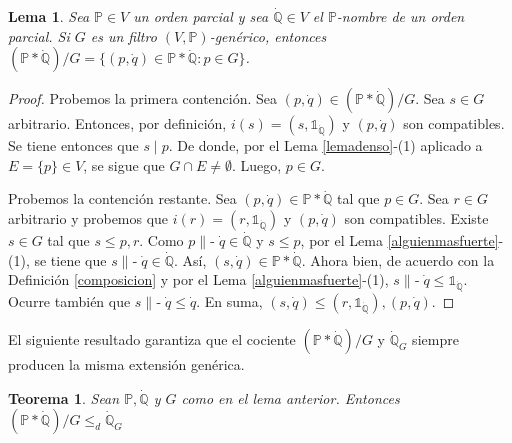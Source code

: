 \documentclass[11pt]{unam_tesis1}
\theoremstyle{MyThmStyle}
\theoremstyle{definition}
\theoremstyle{plain}
\newtheorem{theorem}[definition]{Teorema}
\newtheorem{lemma}[definition]{Lema}
\theoremstyle{remark}
\def\forces{\mathop{\parallel\!\!\!-}\nolimits}
\let\Vdash\forces
\let\leq\leqslant
\begin{document}
\begin{lemma}\label{igualdadcomposicion}
Sea $\mathbb P\in V$ un orden parcial y sea $\dot{\mathbb Q}\in V$ el $\mathbb P$-nombre de un orden parcial. Si $G$ es un filtro $(V,\mathbb P)$-gen\'erico, entonces $(\mathbb P*\dot{\mathbb Q})/G=\{(p,\dot{q})\in \mathbb P*\dot{\mathbb Q}:p\in G \}$.
\end{lemma}

\begin{proof}
Probemos la primera contenci\'on. Sea $(p,\dot q)\in (\mathbb P*\dot{\mathbb Q})/G$. Sea $s\in G$ arbitrario. Entonces, por definici\'on, $i(s)=(s,\mathds 1_{\dot{\mathbb Q}})$ y $(p,\dot q)$ son compatibles. Se tiene entonces que $s\mid p$. De donde, por el Lema \ref{lemadenso}-(1) aplicado a $E=\{p \}\in V$, se sigue que $G\cap E\neq \emptyset$. Luego, $p\in G$.

Probemos la contenci\'on restante. Sea $(p,\dot q)\in \mathbb P*\dot{\mathbb Q}$ tal que $p\in G$. Sea $r\in G$ arbitrario y probemos que $i(r)=(r,\mathds 1_{\dot{\mathbb Q}})$ y $(p,\dot q)$ son compatibles. Existe $s\in G$ tal que $s\leq p,r$. Como $p\Vdash \dot q\in \dot{\mathbb Q}$ y $s\leq p$, por el Lema \ref{alguienmasfuerte}-(1), se tiene que $s\Vdash \dot q\in \dot{\mathbb Q}$. As\'i, $(s,\dot q)\in \mathbb P*\dot{\mathbb Q}$. Ahora bien, de acuerdo con la Definici\'on \ref{composicion} y por el Lema \ref{alguienmasfuerte}-(1), $s\Vdash \dot q\leq \mathds 1_{\dot{\mathbb Q}}$. Ocurre tambi\'en que $s\Vdash \dot q\leq \dot q$. En suma, $(s,\dot q)\leq (r,\mathds 1_{\dot{\mathbb Q}}),(p,\dot q)$.
\end{proof}

El siguiente resultado garantiza que el cociente $(\mathbb P*\dot{\mathbb Q})/G$ y $\dot{\mathbb Q}_G$ siempre producen la misma extensi\'on gen\'erica.

\begin{theorem}\label{encajeentrecomposicion}
Sean $\mathbb P,\dot{\mathbb Q}$ y $G$ como en el lema anterior. Entonces $(\mathbb P *\dot {\mathbb Q})/G \leq_d \dot {\mathbb Q}_G$
\end{theorem}
\end{document}
